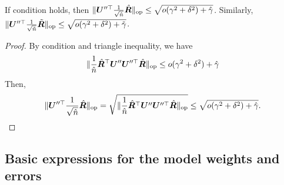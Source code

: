 \begin{lemma}\label{lemma: scale_isotropy_kernel}
If condition \isotropy{} holds, then $\lVert {\bm{U}}''^\top  \frac{1}{\sqrt{\hat{n}}}\hat{{\bm{R}}} \rVert_{\mathrm{op}}\leq \sqrt{o(\gamma^2+\delta^2)+\hat{\gamma}   }$. Similarly, $\lVert {\bm{U}}''^\top  \frac{1}{\sqrt{\tilde{n}}}\tilde{{\bm{R}}} \rVert_{\mathrm{op}}\leq \sqrt{o(\gamma^2+\delta^2)+\tilde{\gamma}   }$.
\end{lemma}
\begin{proof}
By condition \isotropy{} and triangle inequality, we have 
\begin{align}
    \nonumber
    \lVert  \frac{1}{\hat{n}} \hat{{\bm{R}}}^\top {\bm{U}}'' {\bm{U}}''^\top  \hat{{\bm{R}}}  \rVert_{\mathrm{op}} \leq o(\gamma^2+\delta^2)+\hat{\gamma}
\end{align}
Then, 
\begin{align}
    \nonumber
    \lVert {\bm{U}}''^\top  \frac{1}{\sqrt{\hat{n}}}\hat{{\bm{R}}} \rVert_{\mathrm{op}} = \sqrt{\lVert  \frac{1}{\hat{n}} \hat{{\bm{R}}}^\top {\bm{U}}'' {\bm{U}}''^\top  \hat{{\bm{R}}}  \rVert_{\mathrm{op}}  } \leq \sqrt{o(\gamma^2+\delta^2)+\hat{\gamma} }.
\end{align}
\end{proof}



\subsection{Basic expressions for the model weights and errors}

